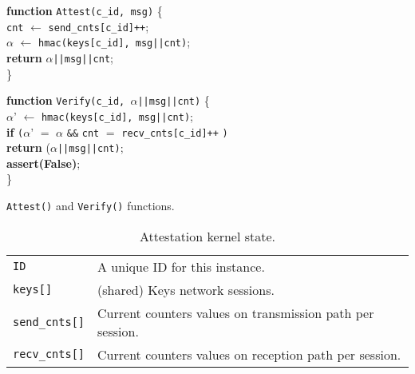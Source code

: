 \begin{algorithm}
\SetAlgoLined
\small
\textbf{function} \texttt{Attest(c\_id, msg)} \{ \\
\Indp
{\tt cnt} $\leftarrow$ {\tt send\_cnts[c\_id]++};\\
$\alpha$ $\leftarrow$ {\tt hmac(keys[c\_id], msg||cnt)}; \\
\textbf{return} $\alpha${\tt ||msg||cnt};\\
\Indm
\} \\


\vspace{0.3cm}

\textbf{function} \texttt{Verify(c\_id, $\alpha$||msg||cnt)} \{ \\
\Indp
    $\alpha$' $\leftarrow$ {\tt hmac(keys[c\_id], msg||cnt)};\\
    \textbf{if} {\tt (}$\alpha$' $=$ $\alpha$ {\tt \&\&} {\tt cnt} $=$ {\tt recv\_cnts[c\_id]++} {\tt )}\\
    \Indp
        \textbf{return} ($\alpha${\tt ||msg||cnt)}; \\
    \Indm
    \textbf{assert(False)}; \\
\Indm
\} \\
\vspace{-1pt}
\caption{\texttt{Attest()} and \texttt{Verify()} functions.}
\label{algo:primitives}
\end{algorithm}

\begin{center}
\begin{table}[ht]
\small
\centering
\begin{tabular}{ |m{2cm}||m{5.6cm}|}
 \hline
 {\tt ID} & A unique ID for this \projecttitle{} instance. \\
 {\tt keys[]} & (shared) Keys network sessions. \\
 {\tt send\_cnts[]} & Current counters values on transmission path per session.\\
 {\tt recv\_cnts[]} & Current counters values on reception path per session.\\
 \hline
 \end{tabular}
\caption{Attestation kernel state.}
\label{table:api}
\end{table}
\end{center}
\fi 


